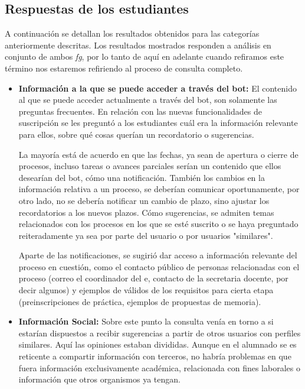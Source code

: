     \subsection{Respuestas de los estudiantes}
    \par A continuación se detallan los resultados obtenidos para las categorías anteriormente descritas. Los resultados mostrados responden a análisis en conjunto de ambos \textit{\acrlong{fg}}, por lo tanto de aquí en adelante cuando refiramos este término nos estaremos refiriendo al proceso de consulta completo.
    
    \begin{itemize}
        \item \textbf{Información a la que se puede acceder a través del bot:} El contenido al que se puede acceder actualmente a través del bot, son solamente las preguntas frecuentes. En relación con las nuevas funcionalidades de suscripción se les preguntó a los estudiantes cuál era la información relevante para ellos, sobre qué cosas querían un recordatorio o sugerencias.
        \par La mayoría está de acuerdo en que las fechas, ya sean de apertura o cierre de procesos, incluso tareas o avances parciales serían un contenido que ellos desearían del bot, cómo una notificación. También los cambios en la información relativa a un proceso, se deberían comunicar oportunamente, por otro lado, no se debería notificar un cambio de plazo, sino ajustar los recordatorios a los nuevos plazos. Cómo sugerencias, se admiten temas relacionados con los procesos en los que se esté suscrito o se haya preguntado reiteradamente ya sea por parte del usuario o por usuarios "similares".
        \par Aparte de las notificaciones, se sugirió dar acceso a información relevante del proceso en cuestión, como el contacto público de personas relacionadas con el proceso (correo el coordinador del \acrshort{e}, contacto de la secretaria docente, por decir algunos) y ejemplos de válidos de los requisitos para cierta etapa (preinscripciones de práctica, ejemplos de propuestas de memoria).
        \item \textbf{Información Social: } Sobre este punto la consulta venía en torno a si estarían dispuestos a recibir sugerencias a partir de otros usuarios con perfiles similares.
        Aquí las opiniones estaban divididas. Aunque en el alumnado se es reticente a compartir información con terceros, no habría problemas en que fuera información exclusivamente académica, relacionada con fines laborales o información que otros organismos ya tengan.

\end{itemize}
